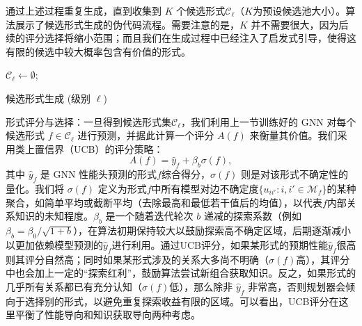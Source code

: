 \documentclass[../main.tex]{subfiles}
\begin{document}
通过上述过程重复生成，直到收集到 $K$ 个候选形式$\mathcal{C}_\ell$（$K$为预设候选池大小）。算法展示了候选形式生成的伪代码流程。需要注意的是，$K$ 并不需要很大，因为后续的评分选择将缩小范围；而且我们在生成过程中已经注入了启发式引导，使得这有限的候选中较大概率包含有价值的形式。

\begin{algorithm}[tb]
	\small
	\DontPrintSemicolon
	$\mathcal{C}_\ell \leftarrow \emptyset$;
	\caption{候选形式生成 (级别 $\ell$)}
	\label{alg:candidates}
\end{algorithm}

形式评分与选择：一旦得到候选形式集$\mathcal{C}_\ell$，我们利用上一节训练好的 GNN 对每个候选形式 $f\in\mathcal{C}_\ell$ 进行预测，并据此计算一个评分 $A(f)$ 来衡量其价值。我们采用类上置信界（UCB）的评分策略：
\begin{equation}
	A(f) = \hat{y}_f + \beta_b \sigma(f),
\end{equation}
其中 $\hat{y}_f$ 是 GNN 性能头预测的形式$f$综合得分，$\sigma(f)$ 则是对该形式不确定性的量化。我们将 $\sigma(f)$ 定义为形式$f$中所有模型对边不确定度$\{u_{ii'}: i,i'\in \mathcal{M}_f\}$的某种聚合，如简单平均或截断平均（去除最高和最低若干值后的均值），以代表$f$内部关系知识的未知程度。$\beta_b$ 是一个随着迭代轮次 $b$ 递减的探索系数（例如$\beta_b = \beta_0 / \sqrt{1+b}$），在算法初期保持较大以鼓励探索高不确定区域，后期逐渐减小以更加依赖模型预测的$\hat{y}_f$进行利用。通过UCB评分，如果某形式的预期性能$\hat{y}_f$很高则其评分自然高；同时如果某形式涉及的关系大多尚不明确（$\sigma(f)$高），其评分中也会加上一定的“探索红利”，鼓励算法尝试新组合获取知识。反之，如果形式的几乎所有关系都已有充分认知（$\sigma(f)$低），那么除非 $\hat{y}_f$ 非常高，否则规划器会倾向于选择别的形式，以避免重复探索收益有限的区域。可以看出，UCB评分在这里平衡了性能导向和知识获取导向两种考虑。
\end{document}

